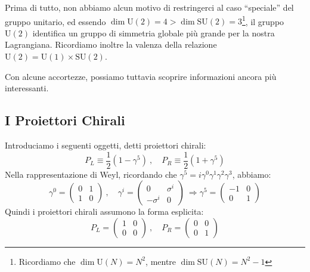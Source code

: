 \documentclass[../main.tex]{subfiles}
\begin{document}
Prima di tutto, non abbiamo alcun motivo di restringerci al caso “speciale” del gruppo unitario, ed essendo $\dim\textrm{U}(2) = 4 > \dim\textrm{SU}(2) = 3$\footnote{Ricordiamo che $\dim\textrm{U}(N) = N^2$, mentre $\dim\textrm{SU}(N) = N^2-1$}, il gruppo $\textrm{U}(2)$ identifica un gruppo di simmetria globale più grande per la nostra Lagrangiana. Ricordiamo inoltre la valenza della relazione $\textrm{U}(2) = \textrm{U}(1)\times \textrm{SU}(2)$.

Con alcune accortezze, possiamo tuttavia scoprire informazioni ancora più interessanti.

\subsection{I Proiettori Chirali}
Introduciamo i seguenti oggetti, detti proiettori chirali:    
\begin{equation}
    \boxed{P_L \equiv \frac{1}{2}(1-\gamma^5)~,\quad P_R \equiv \frac{1}{2}(1+ \gamma^5)}
    \label{eq:chiral_projectors}
\end{equation}
Nella rappresentazione di Weyl, ricordando che $\gamma^5 = i\gamma^0\gamma^1\gamma^2\gamma^3$, abbiamo:
\begin{equation}
    \gamma^0 = \begin{pmatrix}
        0&1\\
        1&0
    \end{pmatrix}~,\quad
    \gamma^i = \begin{pmatrix}
        0&\sigma^i\\
        -\sigma^i&0
    \end{pmatrix}~\Rightarrow
    \gamma^5 = \begin{pmatrix}
        -1&0\\
        0&1
    \end{pmatrix}
    \label{eq:gammas_weyl_rep}
\end{equation}
Quindi i proiettori chirali assumono la forma esplicita:
\begin{equation}
    \boxed{P_L = \begin{pmatrix}
        1&0\\
        0&0
    \end{pmatrix} ~,\quad 
    P_R =  \begin{pmatrix}
        0&0\\
        0&1
    \end{pmatrix}}
    \label{eq:chiral_projectors_explicit}
\end{equation}
\end{document}
